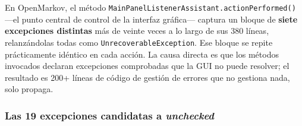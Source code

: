 \documentclass[11pt,a4paper]{article}
\begin{document}
\begin{consecuenciabox}
    En OpenMarkov, el método \texttt{MainPanelListenerAssistant.actionPerformed()} —el punto
    central de control de la interfaz gráfica— captura un bloque de \textbf{siete excepciones
    distintas} más de veinte veces a lo largo de sus 380 líneas, relanzándolas todas como
    \texttt{UnrecoverableException}. Ese bloque se repite prácticamente idéntico en cada
    acción. La causa directa es que los métodos invocados declaran excepciones comprobadas que
    la GUI no puede resolver; el resultado es 200+ líneas de código de gestión de errores que
    no gestiona nada, solo propaga.
\end{consecuenciabox}

\subsubsection{Las 19 excepciones candidatas a \textit{unchecked}}
\end{document}
